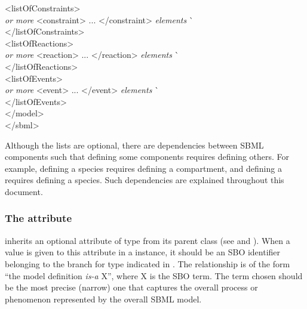 \begin{tt}
\begin{tabbing}
\>\><listOfConstraints>\\
\>\>\>\textrm{\emph{ or more}} <constraint> ... </constraint> \textrm{\emph{elements}}  \` \sayOptional\\
\>\></listOfConstraints>\\
\>\><listOfReactions>\\
\>\>\>\textrm{\emph{ or more}} <reaction> ... </reaction> \textrm{\emph{elements}}  \` \sayOptional\\
\>\></listOfReactions>\\
\>\><listOfEvents>\\
\>\>\>\textrm{\emph{ or more}} <event> ... </event> \textrm{\emph{elements}}  \` \sayOptional\\
\>\></listOfEvents>\\
\></model>\\
</sbml>
\end{tabbing}
\regularspacing
\end{tt}
\vspace*{1.5ex}

Although the lists are optional, there are dependencies between
SBML components such that defining some components requires
defining others.  For example, defining a species requires
defining a compartment, and defining a  requires defining
a species.  Such dependencies are explained throughout this
document.
  




\subsubsection{The  attribute}
\label{sec:model-sboterm}

\Model inherits an optional  attribute of type
 from its parent class \SBase (see
 and ).  When a
value is given to this attribute in a \Model instance, it should
be an SBO identifier belonging to the branch for type \Model
indicated in .  The
  relationship is of the form ``the model definition \emph{is-a}
  X'', where X is the SBO term.  The term chosen should be the
most precise (narrow) one that captures the overall process or
phenomenon represented by the overall SBML model.

